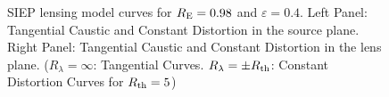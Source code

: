 \begin{figure}[!ht]
\caption{\label{siep_curves_pm-3} SIEP lensing model curves for $R_{\rm
E}=0.98$ and $\varepsilon=0.4$. Left Panel: Tangential Caustic and Constant
Distortion in the source plane. Right Panel: Tangential Caustic and Constant
Distortion in the lens plane. ($R_\lambda=\infty$: Tangential Curves.
$R_\lambda=\pm R_{\rm th}$: Constant Distortion Curves for $R_{\rm th}=5$)}
\end{figure}

